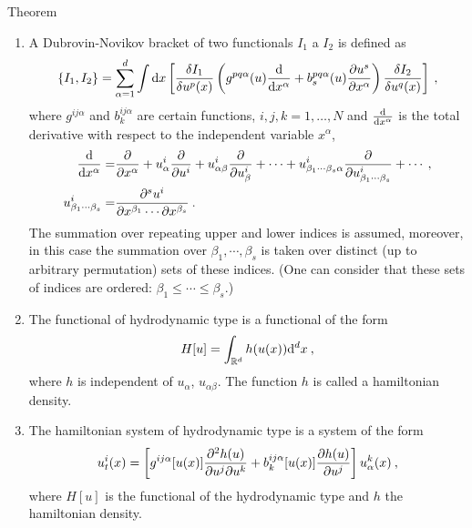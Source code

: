 \begin{definition}Theorem
    \begin{enumerate}
        \item A Dubrovin-Novikov bracket of two functionals $I_1$ a $I_2$ is defined as
        \begin{align}
            \left \lbrace I_1,I_2 \right \rbrace = \sum_{\alpha = 1}^ d \int \mathrm{d} x 
            \left[ \frac{\delta I_1}{\delta u^p(x)} \left( g^{pq \alpha}(u) \frac{\mathrm{d}}{\mathrm{d}x^\alpha} + b^{pq\alpha}_s(u) \frac{\partial u^s}{\partial x^\alpha} \right) \frac{\delta I_2}{\delta u^q(x)} \right] \:, \label{eq:Dubrovin-Novikov bracket}
        \end{align}
        where $g^{ij \alpha}$ and $b_k^{ij \alpha}$ are certain functions, $i,j,k = 1, \dots, N$ and $\frac{\mathrm{d}}{\mathrm{d}x^\alpha}$ is the total derivative with respect to the independent variable $x^\alpha$,
        \begin{align}
            \frac{\mathrm{d}}{\mathrm{d}x^\alpha} =& \frac{\partial }{\partial x^\alpha} + u^i_\alpha \frac{\partial }{\partial u^i} + u^i_{\alpha \beta} \frac{\partial }{\partial u^i_\beta} + \cdots + u^i_{\beta_1 \cdots \beta_s \alpha} \frac{\partial }{\partial u^i_{\beta_1 \cdots \beta_s}} + \cdots \:, \\
            u^i_{\beta_1 \cdots \beta_s} =& \frac{\partial ^s u^i}{\partial x^{\beta_1} \cdots \partial x^{\beta_s}} \:.
        \end{align}
        The summation over repeating upper and lower indices is assumed, moreover, in this case the summation over $\beta_1, \cdots, \beta_s$ is taken over distinct (up to arbitrary permutation) sets of these indices. (One can consider that these sets of indices are ordered: $\beta_1 \leq \cdots \leq \beta_s$.)
        
        \item The functional of hydrodynamic type is a functional of the form
        \begin{align}
            H[u] = \int_{\mathbb{R}^d} h(u(x)) \mathrm{d}^d x \:,
        \end{align}
        where $h$ is independent of $u_\alpha$, $u_{\alpha \beta}$. The function $h$ is called a hamiltonian density.

        \item The hamiltonian system of hydrodynamic type is a system of the form
        \begin{align}
            u^i_t (x) = 
            \left[ g^{ij \alpha} [u(x)] \frac{\partial^2 h(u)}{\partial u^j \partial u^k} + b_k^{ij \alpha} [u(x)] \frac{\partial h(u)}{\partial u^j} \right] u_\alpha^k(x) \:,
        \end{align}
        where $H[u]$ is the functional of the hydrodynamic type and $h$ the hamiltonian density.
    \end{enumerate}
\end{definition}

